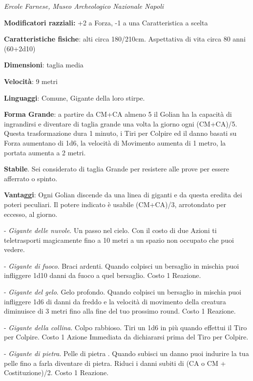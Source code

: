 \begin{multicols}{2}
\begin{center}
	\medskip
	
	\emph{Ercole Farnese, Museo Archeologico Nazionale Napoli}
	
\end{center}


\textbf{Modificatori razziali:} +2 a Forza, -1 a una Caratteristica a scelta

\textbf{Caratteristiche fisiche}: alti circa 180/210cm. Aspettativa di vita circa 80 anni (60+2d10)

\textbf{Dimensioni}: taglia media

\textbf{Velocità}: 9 metri

\textbf{Linguaggi}: Comune, Gigante della loro stirpe.

\textbf{Forma Grande}: a partire da CM+CA almeno 5 il Golian ha la capacità di ingrandirsi e diventare di taglia grande una volta la giorno ogni (CM+CA)/5. Questa trasformazione dura 1 minuto, i Tiri per Colpire ed il danno basati su Forza aumentano di 1d6, la velocità di Movimento aumenta di 1 metro, la portata aumenta a 2 metri.

\textbf{Stabile}. Sei considerato di taglia Grande per resistere alle prove per essere afferrato o spinto.

\textbf{Vantaggi}: Ogni Golian discende da una linea di giganti e da questa eredita dei poteri peculiari. Il potere indicato è usabile (CM+CA)/3, arrotondato per eccesso, al giorno.

- \emph{Gigante delle nuvole}. Un passo nel cielo. Con il costo di due Azioni ti teletrasporti magicamente fino a 10 metri a un spazio non occupato che puoi vedere.

- \emph{Gigante di fuoco}. Braci ardenti. Quando colpisci un bersaglio in mischia puoi infliggere 1d10 danni da fuoco a quel bersaglio. Costo 1 Reazione.

- \emph{Gigante del gelo}. Gelo profondo. Quando colpisci un bersaglio in mischia puoi infliggere 1d6 di danni da freddo e la velocità di movimento della creatura diminuisce di 3 metri fino alla fine del tuo prossimo round. Costo 1 Reazione.

- \emph{Gigante della collina}. Colpo rabbioso. Tiri un 1d6 in più quando effettui il Tiro per Colpire. Costo 1 Azione Immediata da dichiararsi prima del Tiro per Colpire.

- \emph{Gigante di pietra}. Pelle di pietra . Quando subisci un danno puoi indurire la tua pelle fino a farla diventare di pietra. Riduci i danni subiti di (CA o CM + Costituzione)/2. Costo 1 Reazione.


\end{multicols}
